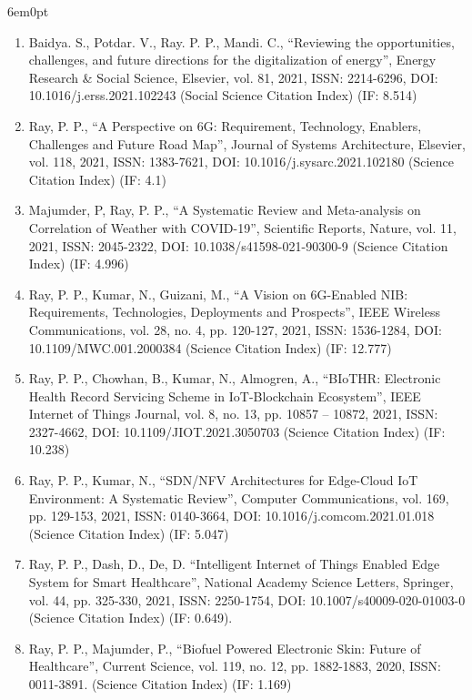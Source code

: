 \documentclass[11pt,a4paper]{moderncv}
\begin{document}
\begin{adjustwidth}{6em}{0pt}
\begin{enumerate}
		\item Baidya. S., Potdar. V., Ray. P. P., Mandi. C., “Reviewing the opportunities, challenges, and future directions for the digitalization of energy”, Energy Research \& Social Science, Elsevier, vol. 81, 2021, ISSN: 2214-6296, DOI: 10.1016/j.erss.2021.102243 (Social Science Citation Index) (IF: 8.514) 
		
		\item Ray, P. P., “A Perspective on 6G: Requirement, Technology, Enablers, Challenges and Future Road Map”, Journal of Systems Architecture, Elsevier, vol. 118, 2021, ISSN: 1383-7621, DOI: 10.1016/j.sysarc.2021.102180 (Science Citation Index) (IF: 4.1)  
		
		\item Majumder, P, Ray, P. P., “A Systematic Review and Meta-analysis on Correlation of Weather with COVID-19”, Scientific Reports, Nature, vol. 11, 2021, ISSN: 2045-2322, DOI: 10.1038/s41598-021-90300-9 (Science Citation Index) (IF: 4.996) 
		
		\item Ray, P. P., Kumar, N., Guizani, M., “A Vision on 6G-Enabled NIB: Requirements, Technologies, Deployments and Prospects”, IEEE Wireless Communications, vol. 28, no. 4, pp. 120-127, 2021, ISSN: 1536-1284, DOI: 10.1109/MWC.001.2000384 (Science Citation Index) (IF: 12.777) 
		
		\item Ray, P. P., Chowhan, B., Kumar, N., Almogren, A., “BIoTHR: Electronic Health Record Servicing Scheme in IoT-Blockchain Ecosystem”, IEEE Internet of Things Journal, vol. 8, no. 13, pp. 10857 – 10872, 2021, ISSN: 2327-4662, DOI: 10.1109/JIOT.2021.3050703 (Science Citation Index) (IF: 10.238)
		
		\item Ray, P. P., Kumar, N., “SDN/NFV Architectures for Edge-Cloud IoT Environment: A Systematic Review”, Computer Communications, vol. 169, pp. 129-153, 2021, ISSN: 0140-3664, DOI: 10.1016/j.comcom.2021.01.018 (Science Citation Index) (IF: 5.047)
		
		\item Ray, P. P., Dash, D., De, D. “Intelligent Internet of Things Enabled Edge System for Smart Healthcare”, National Academy Science Letters, Springer, vol. 44, pp. 325-330, 2021, ISSN: 2250-1754, DOI: 10.1007/s40009-020-01003-0 (Science Citation Index) (IF: 0.649).
		
		\item 	Ray, P. P., Majumder, P., “Biofuel Powered Electronic Skin: Future of Healthcare”, Current Science, vol. 119, no. 12, pp. 1882-1883, 2020, ISSN: 0011-3891. (Science Citation Index) (IF: 1.169) 
		

\end{enumerate}
\end{adjustwidth}
\end{document}
